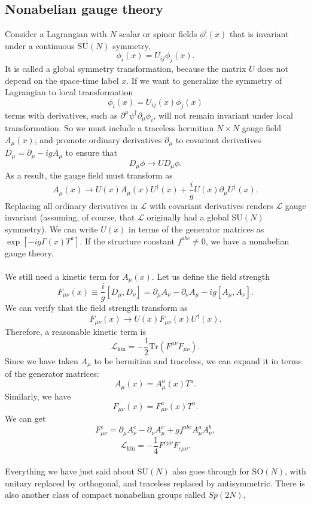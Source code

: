 \subsection{Nonabelian gauge theory}
Consider a Lagrangian with $N$ scalar or spinor fields $\phi^i(x)$ that is invariant under a continuous $\mathrm{SU}(N)$ symmetry,
\[\phi_i(x) = U_{ij}\phi_j(x).\]
It is called a global symmetry transformation, because the matrix $U$ does not depend on the space-time label $x$.
If we want to generalize the symmetry of Lagrangian to local transformation
\[\phi_i(x) = U_{ij}(x)\phi_j(x)\]
terms with derivatives, such as $\partial^{\mu}\psi^{\dagger} \partial_{\mu}\phi_i$, will not remain invariant under local transformation. 
So we must include a traceless hermitian $N \times N$ gauge field $A_{\mu}(x)$, and promote ordinary derivatives $\partial_{\mu}$ to covariant derivatives $D_{\mu} = \partial_{\mu} - igA_{\mu}$ to ensure that
\[D_{\mu}\phi \to UD_{\mu}\phi.\]
As a result, the gauge field must transform as
\[A_{\mu}(x) \to U(x)A_{\mu}(x)U^{\dagger}(x) + \frac{i}{g}U(x)\partial_{\mu}U^{\dagger}(x).\]
Replacing all ordinary derivatives in $\mathcal{L}$ with covariant derivatives renders $\mathcal{L}$ gauge invariant (assuming, of course, that $\mathcal{L}$ originally had a global $\mathrm{SU}(N)$ symmetry).
We can write $U(x)$ in terms of the generator matrices as
$\exp[-ig\Gamma(x)T^a]$. If the structure constant $f^{abc} \neq 0$, we have a nonabelian gauge theory.
\\ \\
We still need a kinetic term for $A_{\mu}(x)$. Let us define the field strength
\[F_{\mu\nu}(x) \equiv \frac{i}{g}[D_{\mu},D_{\nu}] = \partial_{\mu}A_{\nu} - \partial_{\nu}A_{\mu} - ig[A_{\mu},A_{\nu}].\]
We can verify that the field strength transform as
\[F_{\mu\nu}(x) \to U(x)F_{\mu\nu}(x)U^{\dagger}(x).\]
Therefore, a reasonable kinetic term is
\[\mathcal{L}_{\mathrm{kin}} = - \frac{1}{2} \mathrm{Tr}(F^{\mu\nu}F_{\mu\nu}).\]
Since we have taken $A_{\mu}$ to be hermitian and traceless, we can expand it in terms of the generator matrices:
\[A_{\mu}(x) = A^a_{\mu}(x)T^a.\]
Similarly, we have
\[F_{\mu\nu}(x) = F^a_{\mu\nu}(x)T^a .\]
We can get
\[F^{c}_{\mu\nu} = \partial_{\mu}A^c_{\nu} - \partial_{\nu}A^c_{\mu} + gf^{abc}A^a_{\mu}A^b_{\nu},\]
\[\mathcal{L}_{\mathrm{kin}} = -\frac{1}{4}F^{c\mu\nu}F_{c\mu\nu}.\]
\\
Everything we have just said about $\mathrm{SU}(N)$ also goes through for $\mathrm{SO}(N)$, with unitary replaced by orthogonal, and traceless replaced by antisymmetric. There is also another class of compact nonabelian groups called $Sp(2N)$,
